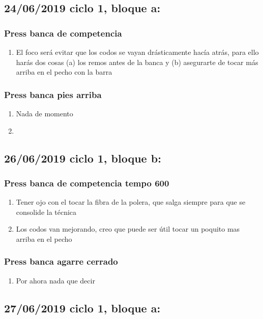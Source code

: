\documentclass[11pt]{article}
\begin{document}
\subsection{24/06/2019 ciclo 1, bloque a:}
\label{sec:orgc47a9e2}
\subsubsection{Press banca de competencia}
\label{sec:org6acddea}
\begin{enumerate}
\item El foco será evitar que los codos se vayan drásticamente hacía
atrás, para ello harás dos cosas (a) los remos antes de la banca y
(b) asegurarte de tocar más arriba en el pecho con la barra
\end{enumerate}
\subsubsection{Press banca pies arriba}
\label{sec:org4c01e62}
\begin{enumerate}
\item Nada de momento
\item 
\end{enumerate}
\subsection{26/06/2019 ciclo 1, bloque b:}
\label{sec:orgf568a54}
\subsubsection{Press banca de competencia tempo 600}
\label{sec:org5ffdcdc}
\begin{enumerate}
\item Tener ojo con el tocar la fibra de la polera, que salga siempre
para que se consolide la técnica
\item Los codos van mejorando, creo que puede ser útil tocar un poquito
mas arriba en el pecho
\end{enumerate}
\subsubsection{Press banca agarre cerrado}
\label{sec:org06d95df}
\begin{enumerate}
\item Por ahora nada que decir
\end{enumerate}
\subsection{27/06/2019 ciclo 1, bloque a:}
\label{sec:org3d20872}
\end{document}
